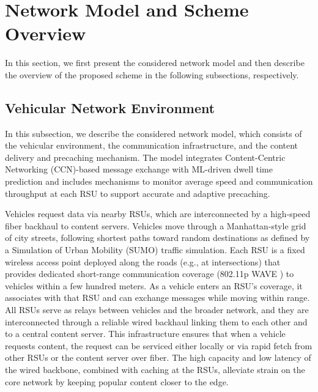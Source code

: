 \documentclass[journal]{IEEEtran}
\begin{document}
\section{Network Model and Scheme Overview} \label{sec.net}
In this section, we first present the considered network model and then describe the overview of the proposed scheme in the following subsections, respectively.

\subsection{Vehicular Network Environment}
In this subsection, we describe the considered network model, which consists of the vehicular environment, the communication infrastructure, and the content delivery and precaching mechanism.
The model integrates Content-Centric Networking (CCN)-based message exchange with ML-driven dwell time prediction and includes mechanisms to monitor average speed and communication throughput at each RSU to support accurate and adaptive precaching.

Vehicles request data via nearby RSUs, which are interconnected by a high-speed fiber backhaul to content servers.
Vehicles move through a Manhattan-style grid of city streets, following shortest paths toward random destinations as defined by a Simulation of Urban Mobility (SUMO) traffic simulation.
Each RSU is a fixed wireless access point deployed along the roads (e.g., at intersections) that provides dedicated short-range communication coverage (802.11p WAVE \cite{WAVE}) to vehicles within a few hundred meters.
As a vehicle enters an RSU's coverage, it associates with that RSU and can exchange messages while moving within range.
All RSUs serve as relays between vehicles and the broader network, and they are interconnected through a reliable wired backhaul linking them to each other and to a central content server.
This infrastructure ensures that when a vehicle requests content, the request can be serviced either locally or via rapid fetch from other RSUs or the content server over fiber.
The high capacity and low latency of the wired backbone, combined with caching at the RSUs, alleviate strain on the core network by keeping popular content closer to the edge.
\end{document}
